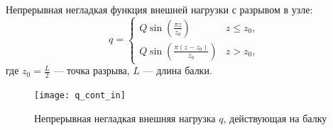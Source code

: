 \documentclass[7pt]{beamer}
\numberwithin{equation}{section}
\begin{document}
\begin{frame}{}
	Непрерывная негладкая функция внешней нагрузки с разрывом в узле:
	\begin{equation}
		q = 
			\begin{cases}
				Q \sin \left(\frac{\pi  z}{z_{0}}\right) & z \leq z_{0}, \\
				Q \sin \left(\frac{\pi  (z-z_{0})}{z_{0}}\right) & z > z_{0},
			\end{cases}
	\end{equation}
	где $z_{0}=\frac{L}{2}$ --- точка разрыва, $L$ --- длина балки. \\
	\begin{figure}[H]
		\centering
		\texttt{[image: q\_cont\_in]}
		\caption{Непрерывная негладкая внешняя нагрузка $q$, действующая на балку}
		\label{fig:q_cont_in}
	\end{figure}
\end{frame}
\end{document}

